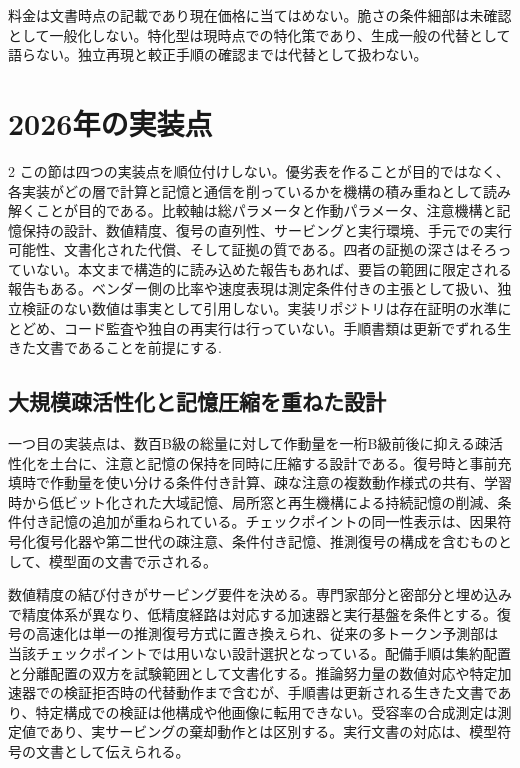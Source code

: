 \documentclass[lualatex,a4paper,10pt]{jlreq}
\begin{document}
\begin{claimboundary}[本節の読解上の境界]
料金は文書時点の記載であり現在価格に当てはめない。脆さの条件細部は未確認として一般化しない。特化型は現時点での特化策であり、生成一般の代替として語らない。独立再現と較正手順の確認までは代替として扱わない。
\end{claimboundary}

\section{2026年の実装点}
\label{sec:capstone}

\begin{multicols}{2}
\raggedcolumns
この節は四つの実装点を順位付けしない。優劣表を作ることが目的ではなく、各実装がどの層で計算と記憶と通信を削っているかを機構の積み重ねとして読み解くことが目的である。比較軸は総パラメータと作動パラメータ、注意機構と記憶保持の設計、数値精度、復号の直列性、サービングと実行環境、手元での実行可能性、文書化された代償、そして証拠の質である。四者の証拠の深さはそろっていない。本文まで構造的に読み込めた報告もあれば、要旨の範囲に限定される報告もある。ベンダー側の比率や速度表現は測定条件付きの主張として扱い、独立検証のない数値は事実として引用しない。実装リポジトリは存在証明の水準にとどめ、コード監査や独自の再実行は行っていない。手順書類は更新でずれる生きた文書であることを前提にする\autocite{v41report,qwen38next,glm5report}.

\subsection{大規模疎活性化と記憶圧縮を重ねた設計}
一つ目の実装点は、数百B級の総量に対して作動量を一桁B級前後に抑える疎活性化を土台に、注意と記憶の保持を同時に圧縮する設計である\autocite{v41report}。復号時と事前充填時で作動量を使い分ける条件付き計算、疎な注意の複数動作様式の共有、学習時から低ビット化された大域記憶、局所窓と再生機構による持続記憶の削減、条件付き記憶の追加が重ねられている。チェックポイントの同一性表示は、因果符号化復号化器や第二世代の疎注意、条件付き記憶、推測復号の構成を含むものとして、模型面の文書で示される\autocite{v41card}。

数値精度の結び付きがサービング要件を決める。専門家部分と密部分と埋め込みで精度体系が異なり、低精度経路は対応する加速器と実行基盤を条件とする。復号の高速化は単一の推測復号方式に置き換えられ、従来の多トークン予測部は当該チェックポイントでは用いない設計選択となっている。配備手順は集約配置と分離配置の双方を試験範囲として文書化する\autocite{dynamo}。推論努力量の数値対応や特定加速器での検証拒否時の代替動作まで含むが、手順書は更新される生きた文書であり、特定構成での検証は他構成や他画像に転用できない\autocite{vllmrecipe}。受容率の合成測定は測定値であり、実サービングの棄却動作とは区別する。実行文書の対応は、模型符号の文書として伝えられる\autocite{vllmv41}。


\end{multicols}
\end{document}
